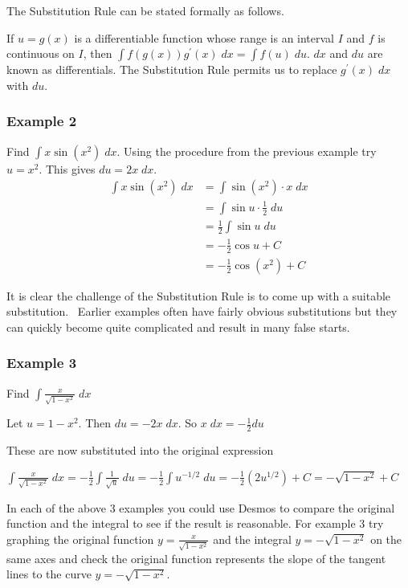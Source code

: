 The Substitution Rule can be stated formally as follows. 

If $u =g (x)$ is a differentiable function whose range is an interval $I$ and $f$ is continuous on $I$, then $\int f \left (g \left (x\right )\right ) g^{ \prime } \left (x\right )\; d x =\int f \left (u\right )\; d u$. $d x$ and $d u$ are known as differentials. The Substitution Rule permits us to replace $g^{ \prime } \left (x\right )\; d x$ with $d u$. 

\subsubsection{Example 2}
Find $\int x \sin  \left (x^{2}\right )\; dx$.
Using the procedure from the previous example try $u =x^{2}$. This gives $d u =2 x\; d x\text{.}$\\
\begin{align*}\int x \sin  \left (x^{2}\right )\; d x &  = \int \sin  \left (x^{2}\right ) \cdot x\; d x \\
 &  = \int \sin  u \cdot \frac{1}{2}\; d u \\
 &  = \frac{1}{2} \int \sin  u\; d u \\
 &  =  -\frac{1}{2} \cos  u +C \\
 &  =  -\frac{1}{2} \cos  \left (x^{2}\right ) +C\end{align*}

It is clear the challenge of the Substitution Rule is to come up with a suitable substitution.
\ Earlier examples often have fairly obvious substitutions but they can quickly become quite complicated and result
in many false starts. 

\subsubsection{Example 3}
Find $\int \frac{x}{\sqrt{1 -x^{2}}}\; d x$ 

Let $u =1 -x^{2}$. Then $d u = -2 x\; d x$. So $x\; d x = -\frac{1}{2} d u$ 

These are now substituted into the original expression 

$\int \frac{x}{\sqrt{1 -x^{2}}}\; d x = -\frac{1}{2} \int \frac{1}{\sqrt{u}}\; d u = -\frac{1}{2} \int u^{ -1/2}\; d u = -\frac{1}{2} \left (2 u^{1/2}\right ) +C = -\sqrt{1 -x^{2}} +C$ 

In each of the above 3 examples you could use Desmos to compare the original function and the integral to
see if the result is reasonable. For example 3 try graphing the original function $y =\frac{x}{\sqrt{1 -x^{2}}}$ and the integral $y = -\sqrt{1 -x^{2}}$ on the same axes and check the original function represents the slope of the tangent lines to the curve $y = -\sqrt{1 -x^{2}}$. 

